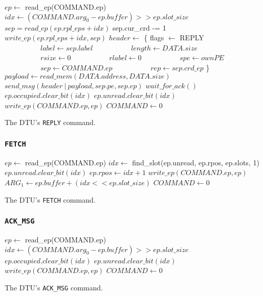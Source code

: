 \documentclass[a4paper,11pt,draft]{article}
\begin{document}
\begin{algorithm}[H]
    $ep \gets$ read\_ep(COMMAND.ep)\;
    \BlankLine
    $idx \gets (COMMAND.arg_0 - ep.buffer) >> ep.slot\_size$\;
    $sep = read\_ep(ep.rpl\_eps + idx)$\;
    \BlankLine
    sep.cur\_crd -= 1\;
    $write\_ep(ep.rpl\_eps + idx, sep)$\;
    \BlankLine
    $header \gets$ \{ flags $\gets$ REPLY\;
    $\quad\quad\quad\quad\quad label \gets sep.label$\;
    $\quad\quad\quad\quad\quad length \gets DATA.size$\;
    $\quad\quad\quad\quad\quad rsize \gets 0$\;
    $\quad\quad\quad\quad\quad rlabel \gets 0$\;
    $\quad\quad\quad\quad\quad spe \gets ownPE$\;
    $\quad\quad\quad\quad\quad sep \gets COMMAND.ep$\;
    $\quad\quad\quad\quad\quad rep \gets sep.crd\_ep$ \}\;
    $payload \gets read\_mem(DATA.address, DATA.size)$\;
    $send\_msg(header\ |\ payload, sep.pe, sep.ep)$\;
    $wait\_for\_ack()$\;
    \BlankLine
    $ep.occupied.clear\_bit(idx)$\;
    $ep.unread.clear\_bit(idx)$\;
    $write\_ep(COMMAND.ep, ep)$\;
    \BlankLine
    $COMMAND \gets 0$\;
    \caption{The DTU's \texttt{REPLY} command.}
\end{algorithm}

\subsubsection{\texttt{FETCH}}

\begin{algorithm}[H]
    $ep \gets$ read\_ep(COMMAND.ep)\;
    \BlankLine
    $idx \gets$ find\_slot(ep.unread, ep.rpos, ep.slots, 1)\;
    $ep.unread.clear\_bit(idx)$\;
    $ep.rpos \gets idx + 1$\;
    $write\_ep(COMMAND.ep, ep)$\;
    \BlankLine
    $ARG_1 \gets ep.buffer + (idx << ep.slot\_size)$\;
    $COMMAND \gets 0$\;
    \caption{The DTU's \texttt{FETCH} command.}
\end{algorithm}

\subsubsection{\texttt{ACK\_MSG}}

\begin{algorithm}[H]
    $ep \gets$ read\_ep(COMMAND.ep)\;
    \BlankLine
    $idx \gets (COMMAND.arg_0 - ep.buffer) >> ep.slot\_size$\;
    $ep.occupied.clear\_bit(idx)$\;
    $ep.unread.clear\_bit(idx)$\;
    $write\_ep(COMMAND.ep, ep)$\;
    \BlankLine
    \BlankLine
    $COMMAND \gets 0$\;
    \caption{The DTU's \texttt{ACK\_MSG} command.}
\end{algorithm}
\end{document}
